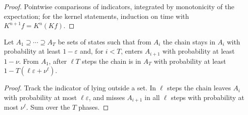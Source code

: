 \begin{proof}\leanok
Pointwise comparisons of indicators, integrated by monotonicity of the expectation;
for the kernel statements, induction on time with $K^{n+1}f=K^n(Kf)$.
\end{proof}
\begin{theorem}\label{thm:phases}
\leanok{}
Let $A_1\supseteq\cdots\supseteq A_T$ be sets of states such that from $A_i$
the chain stays in $A_i$ with probability at least $1-\varepsilon$ and, for
$i<T$, enters $A_{i+1}$ with probability at least $1-\nu$. From $A_1$, after
$\ell T$ steps the chain is in $A_T$ with probability at least
$1-T(\ell\varepsilon+\nu^\ell)$.
\end{theorem}
\begin{proof}\leanok
Track the indicator of lying outside a set. In $\ell$ steps the chain leaves
$A_i$ with probability at most $\ell\varepsilon$, and misses $A_{i+1}$ in all
$\ell$ steps with probability at most $\nu^\ell$. Sum over the $T$ phases.
\end{proof}
